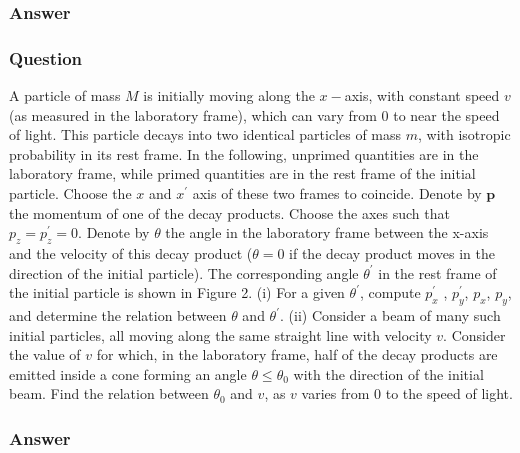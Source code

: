\subsubsection{Answer}



\subsubsection{Question}
A particle of mass $M$ is initially moving along the $x-$axis, with constant speed $v$ (as measured in the laboratory frame), which can vary from $0$ to near the speed of light. This particle decays into two identical particles of mass $m$, with isotropic probability in its rest frame. In the following, unprimed quantities are in the laboratory frame, while primed quantities are in the rest frame of the initial particle. Choose the $x$ and $x^\prime$ axis of these two frames to coincide. Denote by $\mathbf{p}$ the momentum of one of the decay products. Choose the axes such that $p_z = p_z^\prime = 0$. Denote by $\theta$ the angle in the laboratory frame between the x-axis and the velocity of this decay product ($\theta=0$ if the decay product moves in the direction of the initial particle). The corresponding angle $\theta^\prime$ in the rest frame of the initial particle is shown in Figure 2. (i) For a given $\theta^\prime$, compute $p_x^\prime$ , $p_y^\prime$, $p_x$, $p_y$, and determine the relation between $\theta$ and $\theta^\prime$. (ii) Consider a beam of many such initial particles, all moving along the same straight line with velocity $v$. Consider the value of $v$ for which, in the laboratory frame, half of the decay products are emitted inside a cone forming an angle $\theta\le\theta_0$ with the direction of the initial beam. Find the relation between $\theta_0$ and $v$, as $v$ varies from $0$ to the speed of light.

\subsubsection{Answer}


